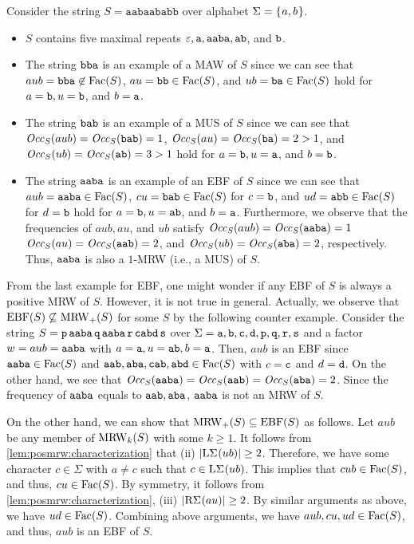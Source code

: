 \begin{example}
  Consider the string $S = \texttt{aabaababb}$ over alphabet $\Sigma = \set{a, b}$.
\begin{itemize}
\item $S$ contains five maximal repeats $\tt \eps, a, aaba, ab$, and $\tt b$.
\item The string $\tt bba$ is an example of a MAW of $S$ since we can see that
$aub = \op{bba} \not\in \Fac(S)$, 
$au = \op{bb} \in \Fac(S)$, and 
  $ub = \op{ba} \in \Fac(S)$ hold
  for $a = \op{b}, u = \op{b}$, and $b = \op{a}$. 
  
\item The string $\tt bab$ is an example of a MUS of $S$
  since
  we can see that 
$\Occ[S](aub)= \Occ[S](\op{bab})= 1$, 
$\Occ[S](au) = \Occ[S](\op{ba}) = 2 > 1$, and 
  $\Occ[S](ub) = \Occ[S](\op{ab}) = 3 > 1$ hold
  for $a = \op{b}, u = \op{a}$, and $b = \op{b}$. 

\item The string $\tt aaba$ is an example of an EBF of $S$
  since we can see that 
$aub = \op{aaba} \in \Fac(S)$, 
$cu = \op{bab} \in \Fac(S)$ for $c = \op{b}$, and 
  $ud = \op{abb} \in \Fac(S)$ for $d = \op{b}$ hold
  for $a = \op{b}, u = \op{ab}$, and $b = \op{a}$. 
  Furthermore, we observe that the frequencies of $aub, au$, and $ub$ satisfy 
  $\Occ[S](aub) = \Occ[S](\op{aaba}) = 1$
  $\Occ[S](au) = \Occ[S](\op{aab}) = 2$, and  
  $\Occ[S](ub) = \Occ[S](\op{aba}) = 2$, respectively.
  Thus, $\tt aaba$ is also a $1$-MRW (i.e., a MUS) of $S$. 
\end{itemize}
\end{example}

From the last example for EBF, one might wonder if any EBF of $S$ is always a positive MRW of $S$. However, it is not true in general.
Actually, we observe that $\EBF(S) \not\subseteq \MRW_{+}(S)$ for some $S$ by the following counter example. Consider the string 
  $S = \tt p\, aaba\, q\, aaba\, r\, cabd\, s$
  over $\Sigma = {\tt a, b, c, d, p, q, r, s}$ and a factor $w = aub = \tt a ab a$ with $a = \op a, u = \op{ab}, b = \op a$.
  Then, $aub$ is an EBF since $\op{aaba} \in \Fac(S)$ and
  $\op{aab, aba, cab, abd} \in \Fac(S)$ with $c = \tt c$ and $d = \tt d$. On the other hand, we see that
  $\Occ[S](\op{aaba}) = \Occ[S](\op{aab}) = \Occ[S](\op{aba}) = 2$.
  Since the frequency of $\op{aaba}$ equals to $\tt aab, aba$, $\op{aaba}$ is not an MRW of $S$.

  On the other hand, we can show that $\MRW_{+}(S) \subseteq \EBF(S)$ as follows. Let $aub$ be any member of $\MRW_k(S)$ with some $k\ge 1$.
  It follows from \cref{lem:posmrw:characterization} that (ii) $|\LSigma[](ub)| \ge 2$. Therefore, we have some character $c \in \Sigma$ with $a \not= c$ such that $c \in \LSigma[](ub)$. This implies that $cub \in \Fac(S)$, and thus, $cu \in \Fac(S)$. By symmetry, it follows from \cref{lem:posmrw:characterization}, (iii) $|\RSigma[](au)| \ge 2$. By similar arguments as above, we have $ud \in \Fac(S)$. Combining above arguments, we have $aub, cu, ud \in \Fac(S)$, and thus, $aub$ is an EBF of $S$.

